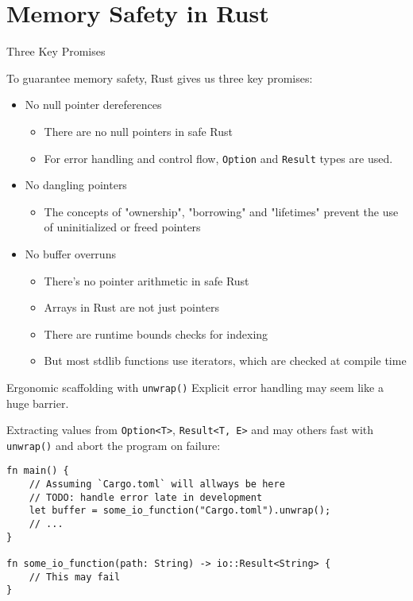\section{Memory Safety in Rust}


\begin{frame}{Three Key Promises}

To guarantee memory safety, Rust gives us three key promises:

\begin{itemize}
	\item No null pointer dereferences
		\begin{itemize}
			\item There are no null pointers in safe Rust
			\item For error handling and control flow, \texttt{Option} and
				\texttt{Result} types are used.
		\end{itemize}
	\pause
	\item No dangling pointers
		\begin{itemize}
			\item The concepts of "ownership", "borrowing" and "lifetimes" prevent the
				use of uninitialized or freed pointers
		\end{itemize}
	\pause
	\item No buffer overruns
		\begin{itemize}
		\item There's no pointer arithmetic in safe Rust
		\item Arrays in Rust are not just pointers
		\item There are runtime bounds checks for indexing
		\item But most stdlib functions use iterators, which are checked at
			compile time
		\end{itemize}
\end{itemize}

\end{frame}



\begin{frame}[fragile]{Ergonomic scaffolding with \texttt{unwrap()}}
Explicit error handling may seem like a huge barrier.

Extracting values from \texttt{Option<T>}, \texttt{Result<T, E>} and may others fast with \texttt{unwrap()} and abort the program on failure:

\begin{verbatim}
fn main() {
    // Assuming `Cargo.toml` will allways be here
    // TODO: handle error late in development
    let buffer = some_io_function("Cargo.toml").unwrap();
    // ...
}

fn some_io_function(path: String) -> io::Result<String> {
    // This may fail
}
\end{verbatim}

\end{frame}





